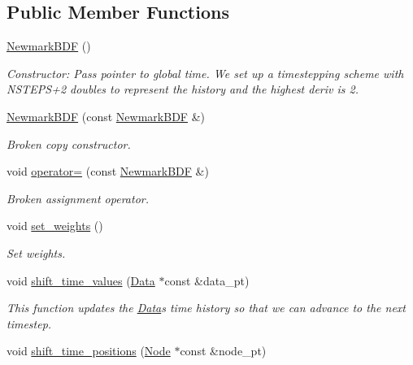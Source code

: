 \subsection*{Public Member Functions}
\begin{DoxyCompactItemize}
\item 
\hyperlink{classoomph_1_1NewmarkBDF_aa816cebef30ae6149297a9d325946649}{Newmark\+B\+DF} ()
\begin{DoxyCompactList}\small\item\em Constructor\+: Pass pointer to global time. We set up a timestepping scheme with N\+S\+T\+E\+P\+S+2 doubles to represent the history and the highest deriv is 2. \end{DoxyCompactList}\item 
\hyperlink{classoomph_1_1NewmarkBDF_aaefae5c777535c3cbd8daab7549a54e5}{Newmark\+B\+DF} (const \hyperlink{classoomph_1_1NewmarkBDF}{Newmark\+B\+DF} \&)
\begin{DoxyCompactList}\small\item\em Broken copy constructor. \end{DoxyCompactList}\item 
void \hyperlink{classoomph_1_1NewmarkBDF_a94d898ccf3bcae3987009d72c26e7496}{operator=} (const \hyperlink{classoomph_1_1NewmarkBDF}{Newmark\+B\+DF} \&)
\begin{DoxyCompactList}\small\item\em Broken assignment operator. \end{DoxyCompactList}\item 
void \hyperlink{classoomph_1_1NewmarkBDF_a338055c11a633d2d22e5fd3b378910b2}{set\+\_\+weights} ()
\begin{DoxyCompactList}\small\item\em Set weights. \end{DoxyCompactList}\item 
void \hyperlink{classoomph_1_1NewmarkBDF_a4726c0ea901167bc2124c63bf6e5f692}{shift\+\_\+time\+\_\+values} (\hyperlink{classoomph_1_1Data}{Data} $\ast$const \&data\+\_\+pt)
\begin{DoxyCompactList}\small\item\em This function updates the \hyperlink{classoomph_1_1Data}{Data}\textquotesingle{}s time history so that we can advance to the next timestep. \end{DoxyCompactList}\item 
void \hyperlink{classoomph_1_1NewmarkBDF_a86ac259d50e62295d13790a5fe49010d}{shift\+\_\+time\+\_\+positions} (\hyperlink{classoomph_1_1Node}{Node} $\ast$const \&node\+\_\+pt)

\end{DoxyCompactItemize}

